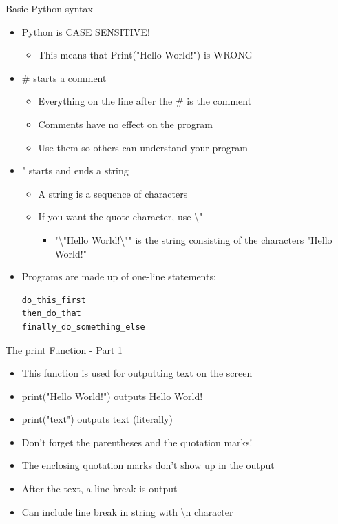 \begin{frame}[fragile]{Basic Python syntax}
  \begin{itemize}
    \item Python is CASE SENSITIVE!
  \begin{itemize}
    \item This means that {\ttfamily Print("Hello World!")} is WRONG
  \end{itemize}
\item {\ttfamily \#} starts a comment
  \begin{itemize}
    \item Everything on the line after the {\ttfamily \#} is the comment
    \item Comments have no effect on the program
    \item Use them so others can understand your program
  \end{itemize}
\item {\ttfamily "} starts and ends a string
  \begin{itemize}
    \item A string is a sequence of characters
    \item If you want the quote character, use {\ttfamily \textbackslash"}
      \begin{itemize}
        \item {\ttfamily "\textbackslash"Hello World!\textbackslash""}
          is the string consisting of the characters
        {\ttfamily "Hello World!"}
      \end{itemize}
  \end{itemize}
\item Programs are made up of one-line statements:
\begin{lstlisting}
do_this_first
then_do_that
finally_do_something_else
\end{lstlisting}
  \end{itemize}
\end{frame}

\begin{frame}[fragile]{The {\ttfamily print} Function - Part 1}
  \begin{itemize}
    \item This function is used for outputting text on the screen
    \item {\ttfamily print("Hello World!")} outputs {\ttfamily Hello World!}
    \item {\ttfamily print("text")} outputs {\ttfamily text} (literally)
  \item Don't forget the parentheses and the quotation marks!
  \item The enclosing quotation marks don't show up in the output
  \item After the text, a line break is output
  \item Can include line break in string with {\ttfamily \textbackslash n} character
  \end{itemize}
\end{frame}

